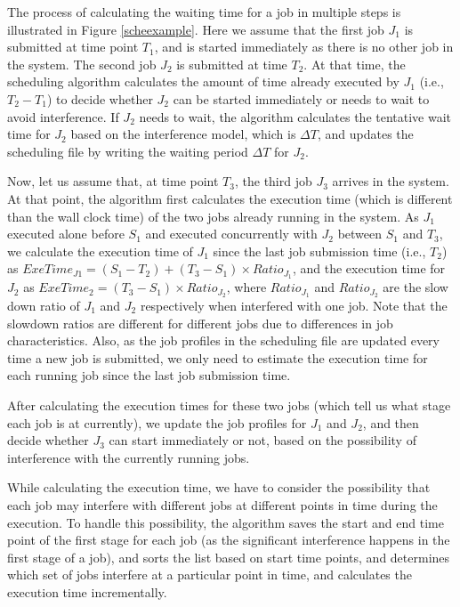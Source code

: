 \noindent
The process of calculating the waiting time for a job in multiple steps is illustrated in Figure \ref{scheexample}. Here we assume that the first job $J_1$ is submitted at time point $T_1$, and is started immediately as there is no other job in the system. The second job $J_2$ is submitted at time $T_2$. At that time, the scheduling algorithm calculates the amount of time already executed by $J_1$ (i.e., $T_2-T_1$) to decide whether $J_2$ can be started immediately or needs to wait to avoid interference. If $J_2$ needs to wait, the algorithm calculates the tentative wait time for $J_2$ based on the interference model, which is $\Delta T$, and updates the scheduling file by writing the waiting period $\Delta T$ for $J_2$.

\noindent
Now, let us assume that, at time point $T_3$, the third job $J_3$ arrives in the system. At that point, the algorithm first calculates the execution time (which is different than the wall clock time) of the two jobs already running in the system. As $J_1$ executed alone before $S_1$ and executed concurrently with $J_2$ between $S_1$ and $T_3$, we calculate the execution time of $J_1$ since the last job submission time (i.e., $T_2$) as $ExeTime_{J1} = (S_1-T_2)+(T_3-S_1) \times Ratio_{J_1}$, and the execution time for $J_2$ as $ExeTime_2 = (T_3-S_1) \times Ratio_{J_2}$, where $Ratio_{J_1}$ and $Ratio_{J_2}$ are the slow down ratio of $J_1$ and $J_2$ respectively when interfered with one job. Note that the slowdown ratios are different for different jobs due to differences in job characteristics. Also, as the job profiles in the scheduling file are updated every time a new job is submitted, we only need to estimate the execution time for each running job since the last job submission time. 

\noindent
After calculating the execution times for these two jobs (which tell us what stage each job is at currently), we update the job profiles for $J_1$ and $J_2$, and then decide whether $J_3$ can start immediately or not, based on the possibility of interference with the currently running jobs. 

\noindent
While calculating the execution time, we have to consider the possibility that each job may interfere with different jobs at different points in time during the execution. To handle this possibility, the algorithm saves the start and end time point of the first stage for each job (as the significant interference happens in the first stage of a job), and sorts the list based on start time points, and determines which set of jobs interfere at a particular point in time, and calculates the execution time incrementally. 

